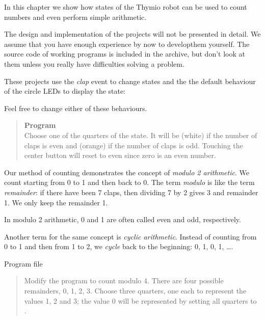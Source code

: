 
\label{ch.counting}

In this chapter we show how states of the Thymio robot can be used to
count numbers and even perform simple arithmetic.

The design and implementation of the projects will not be presented
in detail. We assume that you have enough experience by now to developthem yourself. The source code of working programs is included in the
archive, but don't look at them unless you really have difficulties
solving a problem.

These projects use the \emph{clap} event to change states and the
the default behaviour of the circle LEDs to display
the state:


Feel free to change either of these behaviours.


\begin{quote}
\textbf{Program}\\Choose one of the quarters of the state.
It will be  (white) if the number of claps
is even and  (orange) if the number of claps is odd.
Touching the center button will reset to even
since zero is an even number.
\end{quote}

Our method of counting demonstrates the concept of
\emph{modulo 2 arithmetic}.
We count starting from 0 to 1 and then back to 0.
The term \emph{modulo} is like the term \emph{remainder}:
if there have been 7 claps, then dividing 7 by 2 gives 3 and
remainder 1.
We only keep the remainder 1.

In modulo 2 arithmetic, 0 and 1 are often called even and odd,
respectively.

Another term for the same concept is \emph{cyclic arithmetic}.
Instead of counting from 0 to 1 and then from 1 to 2,
we \emph{cycle} back to the beginning:
0, 1, 0, 1, \ldots.

{\raggedleft \hfill Program file }


\begin{quote}
Modify the program to count modulo 4.
There are four possible remainders, 0, 1, 2, 3.
Choose three quarters, one each to
represent the values 1, 2 and 3; the value 0 will be represented
by setting all quarters to .
\end{quote}

